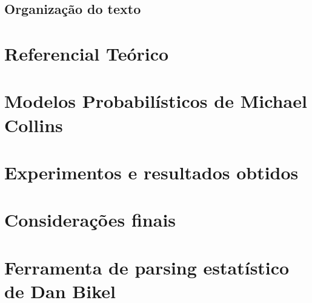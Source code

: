 \documentclass[a4paper]{abnt}
\begin{document}
\newpage

\section{Organização do texto}
\label{sec:organizacao}
	

\chapter{Referencial Teórico}
\label{cha:referencial_teorico}
	

\chapter{Modelos Probabilísticos de Michael Collins}
\label{cha:michael_collins}
	

\chapter{Experimentos e resultados obtidos}
\label{cha:resultados_obtidos}
	

\chapter{Considerações finais}
\label{cha:consideracoes_finais}
	

%	

\appendix

\chapter{Ferramenta de parsing estatístico de Dan Bikel}
\label{cha:dan_bikel1}
	



%
%

\renewcommand{\bibname}{Referência Bibliografia}

\end{document}
